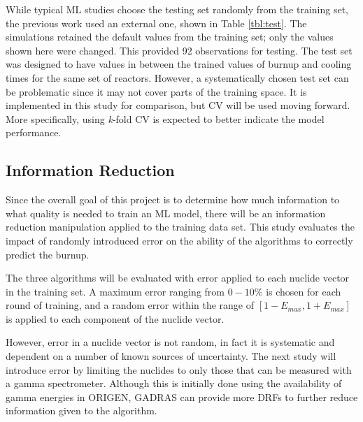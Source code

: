 While typical \gls{ML} studies choose the testing set randomly from the
training set, the previous work used an external one, shown in Table
\ref{tbl:test}.  The simulations retained the default values from the training
set; only the values shown here were changed. This provided 92 observations for
testing.  The test set was designed to have values in between the trained
values of burnup and cooling times for the same set of reactors.  However, a
systematically chosen test set can be problematic since it may not cover parts
of the training space.  It is implemented in this study for comparison, but
\gls{CV} will be used moving forward. More specifically, using \textit{k}-fold
\gls{CV} is expected to better indicate the model performance. 

\subsection{Information Reduction}
\label{sec:inforeduc}

Since the overall goal of this project is to determine how much information to
what quality is needed to train an \gls{ML} model, there will be an
information reduction manipulation applied to the training data set. This study
evaluates the impact of randomly introduced error on the ability of the
algorithms to correctly predict the burnup. 

The three algorithms will be evaluated with error applied to each nuclide
vector in the training set.  A maximum error ranging from $0 - 10\%$ is chosen
for each round of training, and a random error within the range of $[1-E_{max},
1+E_{max}]$ is applied to each component of the nuclide vector.

However, error in a nuclide vector is not random, in fact it is systematic and
dependent on a number of known sources of uncertainty. The next study will
introduce error by limiting the nuclides to only those that can be measured
with a gamma spectrometer. Although this is initially done using the
availability of gamma energies in \gls{ORIGEN}, \gls{GADRAS} can provide more
\gls{DRF}s to further reduce information given to the algorithm.

